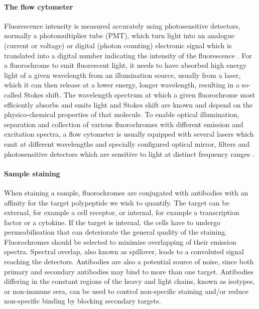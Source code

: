 \paragraph{The flow cytometer}
Fluorescence intensity is measured accurately using photosensitive detectors, normally a photomultiplier tube (PMT), which turn light into an analogue (current or voltage)
or digital (photon counting) electronic signal which is translated into a digital number indicating the intensity of the fluorescence \citep{Shapiro:2003vq,Snow:2004ci}.
For a fluorochrome to emit fluorescent light, it needs to have absorbed high energy light of a given wavelength from an illumination source, usually from a laser, which it can then release at a lower energy, longer wavelength, resulting in a so-called Stokes shift.
The wavelength spectrum at which a given fluorochrome most efficiently absorbs and emits light and Stokes shift are known and depend on the physico-chemical properties of that molecule.
To enable optical illumination, separation and collection of various fluorochromes with different emission and excitation spectra, a flow cytometer is usually equipped with several lasers which emit at different wavelengths and specially configured optical mirror, filters and photosensitive detectors which are sensitive to light at distinct frequency ranges \citep{Shapiro:2003vq}.

\paragraph{Sample staining} 
When staining a sample, fluorochromes are conjugated with antibodies with an affinity for the target polypeptide we wish to quantify.
The target can be external, for example a cell receptor, or internal, for example a transcription factor or a cytokine.
If the target is internal, the cells have to undergo permeabilisation that can deteriorate the general quality of the staining.
Fluorochromes should be selected to minimise overlapping of their emission spectra.
Spectral overlap, also known as spillover, leads to a convoluted signal reaching the detectors.
Antibodies are also a potential source of noise, since both primary and secondary antibodies may bind to more than one target.
Antibodies differing in the constant regions of the heavy and light chains, known as isotypes, or non-immune sera, can be used to control non-specific staining
and/or reduce non-specific binding by blocking secondary targets.

